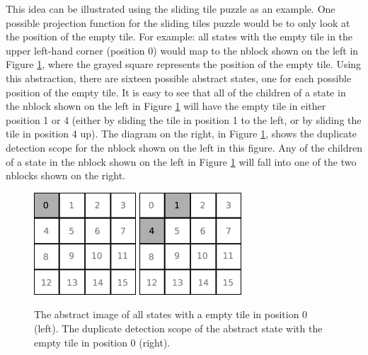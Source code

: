 \documentclass{article}
\begin{document}
 This idea can be illustrated using the sliding tile puzzle as an
 example.  One possible projection function for the sliding tiles
 puzzle would be to only look at the position of the empty tile.  For
 example: all states with the empty tile in the upper left-hand corner
 (position 0) would map to the nblock shown on the left in Figure
 \ref{fig:tile-abstraction}, where the grayed square represents the
 position of the empty tile.  Using this abstraction, there are sixteen
 possible abstract states, one for each possible position of the empty
 tile.  It is easy to see that all of the children of a state in the
 nblock shown on the left in Figure \ref{fig:tile-abstraction} will
 have the empty tile in either position 1 or 4 (either by sliding the
 tile in position 1 to the left, or by sliding the tile in position 4
 up).  The diagram on the right, in Figure \ref{fig:tile-abstraction},
 shows the duplicate detection scope for the nblock shown on the left
 in this figure.  Any of the children of a state in the nblock shown on
 the left in Figure \ref{fig:tile-abstraction} will fall into one of
 the two nblocks shown on the right.

 \begin{figure}[t]
   \begin{center}
     \includegraphics[width=1.5in]{images/tile-abstraction.eps}
     \hspace{.3cm}
     \includegraphics[width=1.5in]{images/duplicate-detection-scope.eps}
     \caption{The abstract image of all states with a empty tile in
       position 0 (left).  The duplicate detection scope of the
       abstract state with the empty tile in position 0 (right).}
     \label{fig:tile-abstraction}
   \end{center}
 \end{figure}
\end{document}
